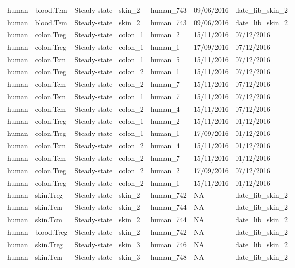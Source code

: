 \begin{table}[ht!]
\begin{tabular}{lllllll}
  human & blood.Tcm & Steady-state & skin\_2 & human\_743 & 09/06/2016 & date\_lib\_skin\_2 \\ 
  human & blood.Tem & Steady-state & skin\_2 & human\_743 & 09/06/2016 & date\_lib\_skin\_2 \\ 
  human & colon.Treg & Steady-state & colon\_1 & human\_2 & 15/11/2016 & 07/12/2016 \\ 
  human & colon.Treg & Steady-state & colon\_1 & human\_1 & 17/09/2016 & 07/12/2016 \\ 
  human & colon.Tcm & Steady-state & colon\_1 & human\_5 & 15/11/2016 & 07/12/2016 \\ 
  human & colon.Treg & Steady-state & colon\_2 & human\_1 & 15/11/2016 & 07/12/2016 \\ 
  human & colon.Tem & Steady-state & colon\_2 & human\_7 & 15/11/2016 & 07/12/2016 \\ 
  human & colon.Tem & Steady-state & colon\_1 & human\_7 & 15/11/2016 & 07/12/2016 \\ 
  human & colon.Tcm & Steady-state & colon\_2 & human\_4 & 15/11/2016 & 07/12/2016 \\ 
  human & colon.Treg & Steady-state & colon\_1 & human\_2 & 15/11/2016 & 01/12/2016 \\ 
  human & colon.Treg & Steady-state & colon\_1 & human\_1 & 17/09/2016 & 01/12/2016 \\ 
  human & colon.Tcm & Steady-state & colon\_2 & human\_4 & 15/11/2016 & 01/12/2016 \\ 
  human & colon.Tem & Steady-state & colon\_2 & human\_7 & 15/11/2016 & 01/12/2016 \\ 
  human & colon.Treg & Steady-state & colon\_2 & human\_2 & 17/09/2016 & 07/12/2016 \\ 
  human & colon.Treg & Steady-state & colon\_2 & human\_1 & 15/11/2016 & 01/12/2016 \\ 
  human & skin.Treg & Steady-state & skin\_2 & human\_742 & NA & date\_lib\_skin\_2 \\ 
  human & skin.Tem & Steady-state & skin\_2 & human\_744 & NA & date\_lib\_skin\_2 \\ 
  human & skin.Tcm & Steady-state & skin\_2 & human\_744 & NA & date\_lib\_skin\_2 \\ 
  human & blood.Treg & Steady-state & skin\_2 & human\_742 & NA & date\_lib\_skin\_2 \\ 
  human & skin.Treg & Steady-state & skin\_3 & human\_746 & NA & date\_lib\_skin\_2 \\ 
  human & skin.Tcm & Steady-state & skin\_3 & human\_748 & NA & date\_lib\_skin\_2 \\ 

\end{tabular}
\end{table}
